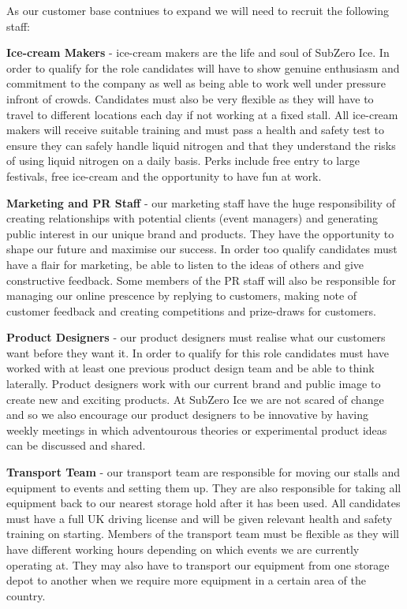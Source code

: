 \documentclass{article}
\begin{document}
  As our customer base contniues to expand we will need to recruit the following staff:

 {\bf Ice-cream Makers} - ice-cream makers are the life and soul of SubZero Ice. In order to qualify for the role candidates will have to show genuine enthusiasm and commitment to the company as well as being able to work well under pressure infront of crowds. Candidates must also be very flexible as they will have to travel to different locations each day if not working at a fixed stall. All ice-cream makers will receive suitable training and must pass a health and safety test to ensure they can safely handle liquid nitrogen and that they understand the risks of using liquid nitrogen on a daily basis. Perks include free entry to large festivals, free ice-cream and the opportunity to have fun at work.

 {\bf Marketing and PR Staff} - our marketing staff have the huge responsibility of creating relationships with potential clients (event managers) and generating public interest in our unique brand and products. They have the opportunity to shape our future and maximise our success. In order too qualify candidates must have a flair for marketing, be able to listen to the ideas of others and give constructive feedback. Some members of the PR staff will also be responsible for managing our online prescence by replying to customers, making note of customer feedback and creating competitions and prize-draws for customers.

{\bf Product Designers} - our product designers must realise what our customers want before they want it. In order to qualify for this role candidates must have worked with at least one previous product design team and be able to think laterally. Product designers work with our current brand and public image to create new and exciting products. At SubZero Ice we are not scared of change and so we also encourage our product designers to be innovative by having weekly meetings in which adventourous theories or experimental product ideas can be discussed and shared.

{\bf Transport Team} - our transport team are responsible for moving our stalls and equipment to events and setting them up. They are also responsible for taking all equipment back to our nearest storage hold after it has been used. All candidates must have a full UK driving license and will be given relevant health and safety training on starting. Members of the transport team must be flexible as they will have different working hours depending on which events we are currently operating at. They may also have to transport our equipment from one storage depot to another when we require more equipment in a certain area of the country.
\end{document}
